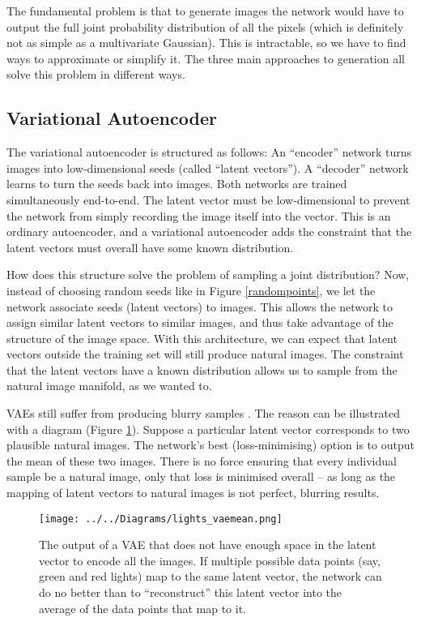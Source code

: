 \documentclass[10pt,a4paper]{article}
\newcommand{\nquote}[1]{``{#1}''}
\begin{document}
The fundamental problem is that to generate images the network would have to output the full joint probability distribution of all the pixels (which is definitely not as simple as a multivariate Gaussian). This is intractable, so we have to find ways to approximate or simplify it. The three main approaches to generation all solve this problem in different ways.

\subsection{Variational Autoencoder}

The variational autoencoder \citep{vae} is structured as follows: An \nquote{encoder} network turns images into low-dimensional seeds (called \nquote{latent vectors}). A \nquote{decoder} network learns to turn the seeds back into images. Both networks are trained simultaneously end-to-end. The latent vector must be low-dimensional to prevent the network from simply recording the image itself into the vector. This is an ordinary autoencoder, and a variational autoencoder adds the constraint that the latent vectors must overall have some known distribution.

How does this structure solve the problem of sampling a joint distribution? Now, instead of choosing random seeds like in Figure \ref{randompoints}, we let the network associate seeds (latent vectors) to images. This allows the network to assign similar latent vectors to similar images, and thus take advantage of the structure of the image space. With this architecture, we can expect that latent vectors outside the training set will still produce natural images. The constraint that the latent vectors have a known distribution allows us to sample from the natural image manifold, as we wanted to.

VAEs still suffer from producing blurry samples \citep{vaeunderstanding}. The reason can be illustrated with a diagram (Figure \ref{vaemean}). Suppose a particular latent vector corresponds to two plausible natural images. The network's best (loss-minimising) option is to output the mean of these two images. There is no force ensuring that every individual sample be a natural image, only that loss is minimised overall -- as long as the mapping of latent vectors to natural images is not perfect, blurring results.

\begin{figure}
  \centering
  \texttt{[image: ../../Diagrams/lights\_vaemean.png]}
  \caption{The output of a VAE that does not have enough space in the latent vector to encode all the images. If multiple possible data points (say, green and red lights) map to the same latent vector, the network can do no better than to \nquote{reconstruct} this latent vector into the average of the data points that map to it.}
  \label{vaemean}
\end{figure}
\end{document}
